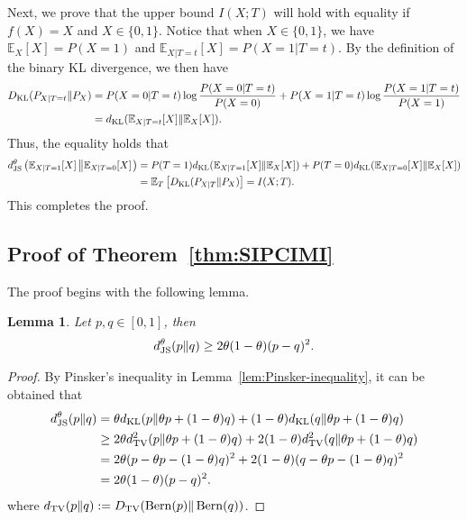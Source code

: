 \documentclass[onecolumn,romanappendices,10pt]{IEEEtran}
\newtheorem{lemma}{Lemma}
\newcommand{\EE}{{\mathbb{E}}}
\DeclareMathOperator{\Bernoulli}{Bern}
\begin{document}
	Next, we prove that the upper bound $I(X; T)$ will hold with equality if $f(X) = X$ and $X \in \{0,1\}$. Notice that when $X \in \{0,1\}$, we have $\EE_X [X] = P(X=1)$ and $\EE_{X|T=t} [X] = P(X=1|T=t)$. By the definition of the binary KL divergence, we then have
	\begin{equation}
		\begin{aligned}
			D_{\textnormal{KL}}(P_{X|T=t} \| P_X) &= P(X=0|T=t) \log \frac{P(X=0|T=t)}{P(X=0)} + P(X=1|T=t) \log \frac{P(X=1|T=t)}{P(X=1)} \\
			&= d_{\textnormal{KL}}(\EE_{X|T=t} [X] \| \EE_X [X]).
		\end{aligned}
	\end{equation}
	Thus, the equality holds that
	\begin{equation}
		\begin{aligned}
			d^\theta_{\textnormal{JS}} \left( \EE_{X|T=1} [X] \left\| \EE_{X|T=0} [X] \right. \right) &= P(T=1) d_{\textnormal{KL}}(\EE_{X|T = 1} [X] \| \EE_{X} [X]) + P(T=0) d_{\textnormal{KL}}(\EE_{X|T=0} [X] \| \EE_{X} [X]) \\
			&= \EE_{T} \left[ D_{\textnormal{KL}}(P_{X|T} \| P_X) \right] = I(X; T).
		\end{aligned}
	\end{equation}
	This completes the proof.
	
	\subsection{Proof of Theorem~\ref{thm:SIPCIMI}} \label{subapp:SIPCIMI}
	The proof begins with the following lemma.
	\begin{lemma} \label{lem:js-lb}
		Let $p, q \in [0, 1]$, then
		\begin{equation}
			\begin{aligned}
				d^\theta_{\textnormal{JS}}(p \| q) \geq 2 \theta (1 - \theta) (p - q)^2.
			\end{aligned}
		\end{equation}
	\end{lemma}
	
	\begin{proof}
		By Pinsker's inequality in Lemma~\ref{lem:Pinsker-inequality}, it can be obtained that
		\begin{equation}
			\begin{aligned}
				d^\theta_{\textnormal{JS}}(p \| q) &= \theta d_{\textnormal{KL}}(p \| \theta p + (1 - \theta) q) + (1 - \theta) d_{\textnormal{KL}}(q \| \theta p + (1 - \theta) q) \\
				&\geq 2\theta d^2_{\textnormal{TV}}(p \| \theta p + (1 - \theta) q) + 2(1 - \theta) d^2_{\textnormal{TV}}(q \| \theta p + (1 - \theta) q) \\
				&= 2\theta (p - \theta p - (1 - \theta) q)^2 + 2(1 - \theta) (q - \theta p - (1 - \theta) q)^2 \\
				&= 2 \theta (1 - \theta) (p - q)^2.
			\end{aligned}
		\end{equation}
		where $d_{\textnormal{TV}}(p \| q) := D_{\textnormal{TV}}(\Bernoulli(p) \| \Bernoulli(q))$.
	\end{proof}
	
\end{document}
